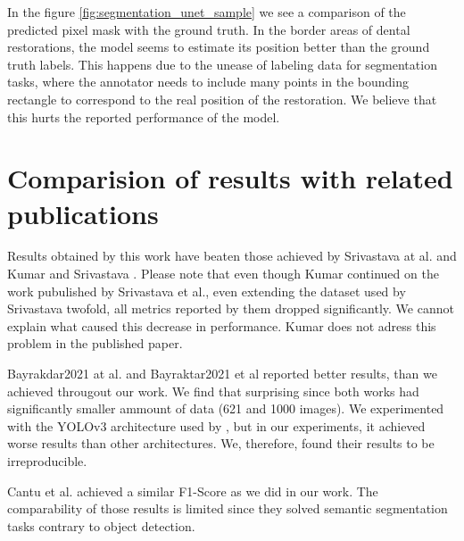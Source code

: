 In the figure \ref{fig:segmentation_unet_sample} we see a comparison of the predicted pixel mask with the ground truth. In the border areas of dental restorations, the model seems to estimate its position better than the ground truth labels. This happens due to the unease of labeling data for segmentation tasks, where the annotator needs to include many points in the bounding rectangle to correspond to the real position of the restoration. We believe that this hurts the reported performance of the model.



\section{Comparision of results with related publications}

Results obtained by this work have beaten those achieved by Srivastava at al. \cite{Srivastava2017} and Kumar and Srivastava \cite{Kumar}. Please note that even though Kumar continued on the work pubulished by Srivastava et al., even extending the dataset used by Srivastava twofold, all metrics reported by them dropped significantly. We cannot explain what caused this decrease in performance. Kumar does not adress this problem in the published paper.

Bayrakdar2021 at al. \cite{Bayrakdar2021} and Bayraktar2021 et al \cite{Bayraktar2021} reported better results, than we achieved througout our work. We find that surprising since both works had significantly smaller ammount of data (621 and 1000 images). We experimented with the YOLOv3 architecture used by \cite{Bayraktar2021}, but in our experiments, it achieved worse results than other architectures. We, therefore, found their results to be irreproducible.

Cantu et al. achieved a similar F1-Score as we did in our work. The comparability of those results is limited since they solved semantic segmentation tasks contrary to object detection.
